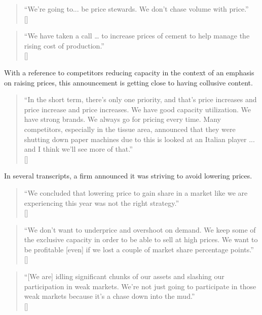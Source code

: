 \begin{quote}
``We're going to... be price stewards. We don't chase volume with price.'' \\
\mbox{[]}
\end{quote}

\begin{quote}
``We have taken a call … to increase prices of cement to help manage the rising cost of production.'' \\
\mbox{[]}
\end{quote}

With a reference to competitors reducing capacity in the context of an emphasis on raising prices, this announcement is getting close to having collusive content.

\begin{quote}
``In the short term, there's only one priority, and that's price increases and price increase and price increases. We have good capacity utilization. We have strong brands. We always go for pricing every time. Many competitors, especially in the tissue area, announced that they were shutting down paper machines due to this is looked at an Italian player ... and I think we'll see more of that.'' \\
\mbox{[]}
\end{quote}

In several transcripts, a firm announced it was striving to avoid lowering prices.

\begin{quote}
``We concluded that lowering price to gain share in a market like we are experiencing this year was not the right strategy.'' \\
\mbox{[]}
\end{quote}

\begin{quote}
``We don't want to underprice and overshoot on demand. We keep some of the exclusive capacity in order to be able to sell at high prices. We want to be profitable [even] if we lost a couple of market share percentage points.'' \\
\mbox{[]}
\end{quote}

\begin{quote}
``[We are] idling significant chunks of our assets and slashing our participation in weak markets. We're not just going to participate in those weak markets because it's a chase down into the mud.'' \\
\mbox{[]}
\end{quote}

